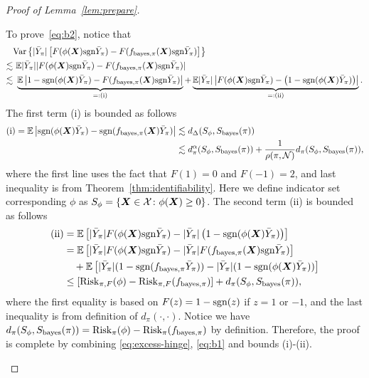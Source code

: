 \documentclass[11pt]{article}
\newcommand*{\KeepStyleUnderBrace}[1]{%
\mathop{%
\mathchoice
{\underbrace{\displaystyle#1}}%
{\underbrace{\textstyle#1}}%
{\underbrace{\scriptstyle#1}}%
{\underbrace{\scriptscriptstyle#1}}%
}\limits
}
\theoremstyle{plain}
\theoremstyle{definition}
\def\sign{\textup{sgn}}
\def\bayesS{S_{\textup{bayes}}}
\def\bayespif{f_{\textup{bayes},\pi}}
\def\risk{\textup{Risk}_\pi}
\def\shift{\bar Y_\pi}
\def\riskF{\textup{Risk}_{\pi,F}}
\begin{document}
\begin{proof}[Proof of Lemma~\ref{lem:prepare}]
\begin{enumerate}[label={2.\arabic*},wide, labelwidth=!, labelindent=0pt]
To prove~\eqref{eq:b2}, notice that 
\begin{align}\label{eq:excess-hinge}
&\text{Var}\left\{|\shift|\left[F(\phi(\mX)\sign \shift)-F(\bayespif(\mX)\sign \shift)\right]\right\} \notag \\
\lesssim &\  \mathbb{E}|\shift||F(\phi(\mX)\sign\shift)-F(\bayespif(\mX)\sign \shift)|\notag \\
 \lesssim &\  \KeepStyleUnderBrace{\mathbb{E}\left| 1-\sign(\phi(\mX)\shift)- F(\bayespif(\mX)\sign \shift)\right
|}_{=:\text{(i)}} +\KeepStyleUnderBrace{\mathbb{E}|\shift|\left|F( \phi(\mX)\sign \shift)- \left(1-\sign(\phi(\mX)\shift)\right) \right|}_{=:\text{(ii)}}.
\end{align}
The first term (i) is bounded as follows
\begin{align}
\text{(i)}=\mathbb{E}\left|\sign (\phi(\mX)\shift)-\sign (\bayespif(\mX)\shift)\right|&\lesssim d_\Delta(S_\phi,\bayesS(\pi))\\&\lesssim  d^\alpha_{\pi}(S_\phi,\bayesS(\pi))+{1\over \rho(\pi, \tN)}d_{\pi}(S_\phi,\bayesS(\pi)),
\end{align}
where the first line uses the fact that $F(1)=0$ and $F(-1)=2$, and last inequality is from Theorem~\ref{thm:identifiability}. Here we define indicator set corresponding $\phi$ as $S_\phi = \{\bm X\in\mathcal{X}\colon \phi(\bm X)\geq 0\}$.
The second term (ii) is bounded as follows
\begin{align}
    \text{(ii)}
    &=\mathbb{E}\left[ |\shift| F(\phi(\mX)\sign \shift)- |\shift|\left(1-\sign(\phi(\mX)\shift)\right)\right] \\
    &= \mathbb{E}\left[|\shift|F(\phi(\mX)\sign \shift)-|\shift|F(\bayespif(\mX)\sign \shift)\right]\\
    & \quad + \mathbb{E}\left[|\shift|(1-\sign(\bayespif\shift))-|\shift|(1-\sign(\phi(\mX)\shift))\right]\\
    &\leq [\riskF(\phi)-\riskF(\bayespif)]+d_\pi(S_\phi,\bayesS(\pi)),
\end{align}
where the first equality is based on $F(z) = 1-\sign(z)$ if $z = 1$ or $-1$, and the last inequality is from definition of $d_\pi(\cdot,\cdot)$.  Notice we have  $d_\pi(S_\phi,\bayesS(\pi)) = \risk(\phi)-\risk(\bayespif)$ by definition. Therefore, the proof is complete by combining \eqref{eq:excess-hinge}, \eqref{eq:b1} and bounds (i)-(ii).



\end{enumerate}
\end{proof}
\end{document}
